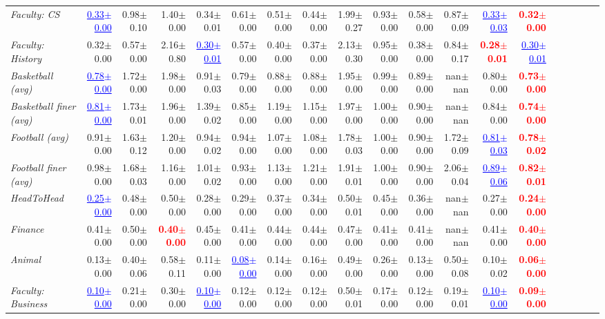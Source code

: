 \documentclass[nohyperref]{article}
\theoremstyle{plain}
\theoremstyle{definition}
\theoremstyle{remark}
\newcommand{\red}[1]{\textcolor{red}{\textbf{#1}}}
\newcommand{\blue}[1]{\textcolor{blue}{\underline{#1}}}
\begin{document}
\begin{table*}[!tb]
{\begin{tabular}{lrrrrrrrrrrrrrrrrrr}
			{\it Faculty: CS} & \blue{0.33$\pm$0.00} & 0.98$\pm$0.10 & 1.40$\pm$0.00 & 0.34$\pm$0.01 & 0.61$\pm$0.00 & 0.51$\pm$0.00 & 0.44$\pm$0.00 & 1.99$\pm$0.27 & 0.93$\pm$0.00 & 0.58$\pm$0.00 & 0.87$\pm$0.09 & \blue{0.33$\pm$0.03} & \red{0.32$\pm$0.00} \\
			{\it Faculty: History} & 0.32$\pm$0.00 & 0.57$\pm$0.00 & 2.16$\pm$0.80 & \blue{0.30$\pm$0.01} & 0.57$\pm$0.00 & 0.40$\pm$0.00 & 0.37$\pm$0.00 & 2.13$\pm$0.30 & 0.95$\pm$0.00 & 0.38$\pm$0.00 & 0.84$\pm$0.17 & \red{0.28$\pm$0.01} & \blue{0.30$\pm$0.01} \\
			{\it Basketball (avg)} & \blue{0.78$\pm$0.00} & 1.72$\pm$0.00 & 1.98$\pm$0.00 & 0.91$\pm$0.03 & 0.79$\pm$0.00 & 0.88$\pm$0.00 & 0.88$\pm$0.00 & 1.95$\pm$0.00 & 0.99$\pm$0.00 & 0.89$\pm$0.00 & nan$\pm$nan & 0.80$\pm$0.00 & \red{0.73$\pm$0.00} \\
			{\it Basketball finer (avg)} & \blue{0.81$\pm$0.00} & 1.73$\pm$0.01 & 1.96$\pm$0.00 & 1.39$\pm$0.02 & 0.85$\pm$0.00 & 1.19$\pm$0.00 & 1.15$\pm$0.00 & 1.97$\pm$0.00 & 1.00$\pm$0.00 & 0.90$\pm$0.00 & nan$\pm$nan & 0.84$\pm$0.00 & \red{0.74$\pm$0.00} \\
			{\it Football (avg)} & 0.91$\pm$0.00 & 1.63$\pm$0.12 & 1.20$\pm$0.00 & 0.94$\pm$0.02 & 0.94$\pm$0.00 & 1.07$\pm$0.00 & 1.08$\pm$0.00 & 1.78$\pm$0.03 & 1.00$\pm$0.00 & 0.90$\pm$0.00 & 1.72$\pm$0.09 & \blue{0.81$\pm$0.03} & \red{0.78$\pm$0.02} \\
			{\it Football finer (avg)} & 0.98$\pm$0.00 & 1.68$\pm$0.03 & 1.16$\pm$0.00 & 1.01$\pm$0.02 & 0.93$\pm$0.00 & 1.13$\pm$0.00 & 1.21$\pm$0.00 & 1.91$\pm$0.01 & 1.00$\pm$0.00 & 0.90$\pm$0.00 & 2.06$\pm$0.04 & \blue{0.89$\pm$0.06} & \red{0.82$\pm$0.01} \\
\midrule
{\it HeadToHead} & \blue{0.25$\pm$0.00} & 0.48$\pm$0.00 & 0.50$\pm$0.00 & 0.28$\pm$0.00 & 0.29$\pm$0.00 & 0.37$\pm$0.00 & 0.34$\pm$0.00 & 0.50$\pm$0.01 & 0.45$\pm$0.00 & 0.36$\pm$0.00 & nan$\pm$nan & 0.27$\pm$0.00 & \red{0.24$\pm$0.00} \\
			{\it Finance} & 0.41$\pm$0.00 & 0.50$\pm$0.00 & \red{0.40$\pm$0.00} & 0.45$\pm$0.00 & 0.41$\pm$0.00 & 0.44$\pm$0.00 & 0.44$\pm$0.00 & 0.47$\pm$0.00 & 0.41$\pm$0.00 & 0.41$\pm$0.00 & nan$\pm$nan & 0.41$\pm$0.00 & \red{0.40$\pm$0.00} \\
			{\it Animal} & 0.13$\pm$0.00 & 0.40$\pm$0.06 & 0.58$\pm$0.11 & 0.11$\pm$0.00 & \blue{0.08$\pm$0.00} & 0.14$\pm$0.00 & 0.16$\pm$0.00 & 0.49$\pm$0.00 & 0.26$\pm$0.00 & 0.13$\pm$0.00 & 0.50$\pm$0.08 & 0.10$\pm$0.02 & \red{0.06$\pm$0.00} \\
			{\it Faculty: Business} & \blue{0.10$\pm$0.00} & 0.21$\pm$0.00 & 0.30$\pm$0.00 & \blue{0.10$\pm$0.00} & 0.12$\pm$0.00 & 0.12$\pm$0.00 & 0.12$\pm$0.00 & 0.50$\pm$0.01 & 0.17$\pm$0.00 & 0.12$\pm$0.00 & 0.19$\pm$0.01 & \blue{0.10$\pm$0.00} & \red{0.09$\pm$0.00} \\

\end{tabular}}
\end{table*}
\end{document}
